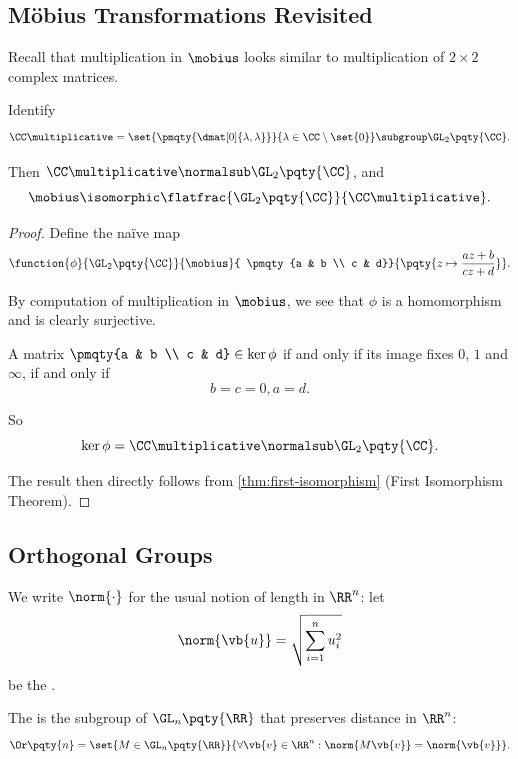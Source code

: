 \subsection{M\"{o}bius Transformations Revisited}
\label{sec:mobius-transformations-revisited}

Recall that multiplication in \(\mobius\) looks similar to multiplication of \(2 \times 2\) complex matrices.

\begin{proposition}
    \label{prop:identification-of-mobius-group}%
    Identify
    \[
        \CC\multiplicative = \set{\pmqty{\dmat[0]{\lambda, \lambda}}}{\lambda \in \CC \setminus \set{0}} \subgroup \GL_2\pqty{\CC}.
    \]

    Then \(\CC\multiplicative \normalsub \GL_2\pqty{\CC}\), and
    \[
        \mobius \isomorphic \flatfrac{\GL_2\pqty{\CC}}{\CC\multiplicative}.
    \]
\end{proposition}

\begin{proof}
    Define the na\"{i}ve map
    \[
        \function{\phi}{\GL_2\pqty{\CC}}{\mobius}{
            \pmqty{a & b \\ c & d}}{\pqty{z \mapsto \frac{az + b}{cz + d}}}.
    \]

    By computation of multiplication in \(\mobius\), we see that \(\phi\) is a homomorphism and is clearly surjective.

    A matrix \(\pmqty{a & b \\ c & d} \in \ker \phi\) if and only if its image fixes \(0\), \(1\) and \(\infty\), if and only if
    \[
        b = c = 0, a = d.
    \]

    So
    \[
        \ker \phi = \CC\multiplicative \normalsub \GL_2\pqty{\CC}.
    \]

    The result then directly follows from \autoref{thm:first-isomorphism} (First Isomorphism Theorem).
\end{proof}

\subsection{Orthogonal Groups}
\label{sec:orthogonal-groups}

We write \(\norm{\cdot}\) for the usual notion of length in \(\RR^n\): let
\[
    \norm{\vb{u}} = \sqrt{\sum_{i = 1}^{n} u_i^2}
\]
be the .

\begin{definition}
    \label{def:orthogonal-group}%
    The  is the subgroup of \(\GL_n\pqty{\RR}\) that preserves distance in \(\RR^n\):
    \[
        \Or\pqty{n} = \set{M \in \GL_n\pqty{\RR}}{\forall \vb{v} \in \RR^n: \norm{M\vb{v}} = \norm{\vb{v}}}.
    \]
\end{definition}

